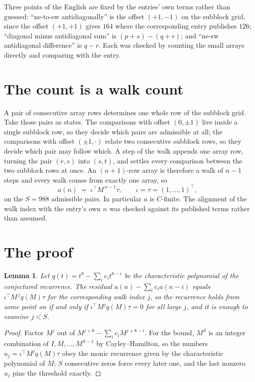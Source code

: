 \documentclass[11pt,a4paper]{article}
\theoremstyle{plain}
\newtheorem{lemma}[theorem]{Lemma}
\theoremstyle{definition}
\begin{document}
Three points of the English are fixed by the entries' own terms rather than guessed:
``ne-to-sw antidiagonally'' is the offset $(+1,-1)$ on the subblock grid, since the offset
$(+1,+1)$ gives $164$ where the corresponding entry publishes $126$; ``diagonal minus
antidiagonal sum'' is $(p+s)-(q+r)$; and ``ne-sw antidiagonal difference'' is $q-r$. Each was
checked by counting the small arrays directly and comparing with the entry.

\section{The count is a walk count}

A pair of consecutive array rows determines one whole row of the subblock grid. Take those
pairs as states. The comparisons with offset $(0,\pm1)$ live inside a single subblock row, so
they decide which pairs are admissible at all; the comparisons with offset $(\pm1,\cdot)$
relate two consecutive subblock rows, so they decide which pair may follow which. A step of the
walk appends one array row, turning the pair $(r,s)$ into $(s,t)$, and settles every comparison
between the two subblock rows at once. An $(n+1)$-row array is therefore a walk of $n-1$ steps
and every walk comes from exactly one array, so
\[
a(n)\;=\;\iota^{\!\top}M^{\,n-1}\tau,\qquad \iota=\tau=(1,\dots,1)^{\!\top},
\]
on the $S=988$ admissible pairs. In particular $a$ is $C$-finite. The alignment of the walk
index with the entry's own $n$ was checked against its published terms rather than assumed.

\section{The proof}

\begin{lemma}\label{lem:crit}
Let $q(t)=t^{8}-\sum_i c_it^{8-i}$ be the characteristic polynomial of the
conjectured recurrence. The residual $a(n)-\sum_ic_ia(n-i)$ equals
$\iota^{\!\top}M^{\,j}q(M)\tau$ for the corresponding walk index $j$, so the recurrence
holds from some point on if and only if $\iota^{\!\top}M^{j}q(M)\tau=0$ for all large $j$,
and it is enough to examine $j<S$.
\end{lemma}

\begin{proof}
Factor $M^{j}$ out of $M^{j+8}-\sum_ic_iM^{j+8-i}$. For the bound, $M^{S}$
is an integer combination of $I,M,\dots,M^{S-1}$ by Cayley--Hamilton, so the numbers
$u_j=\iota^{\!\top}M^{j}q(M)\tau$ obey the monic recurrence given by the characteristic
polynomial of $M$; $S$ consecutive zeros force every later one, and the last nonzero $u_j$
pins the threshold exactly.
\end{proof}
\end{document}
